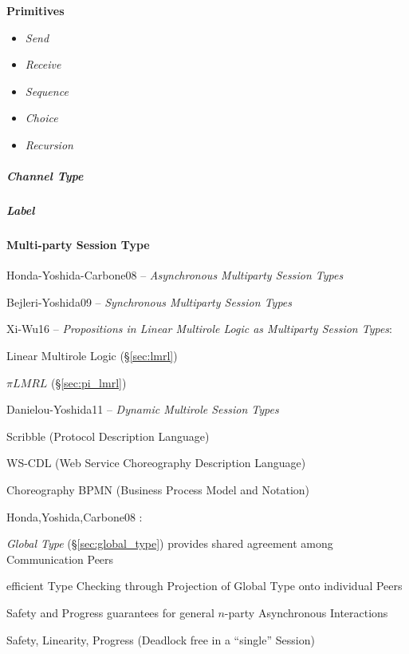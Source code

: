 \textbf{Primitives}

\begin{itemize}
  \item \emph{Send}
  \item \emph{Receive}
  \item \emph{Sequence}
  \item \emph{Choice}
  \item \emph{Recursion}
\end{itemize}



\subparagraph{Channel Type}\label{sec:channel_type}\hfill

\subparagraph{Label}\label{sec:channel_label}\hfill



\paragraph{Multi-party Session Type}\label{sec:multiparty_session}\hfill

Honda-Yoshida-Carbone08 -- \emph{Asynchronous Multiparty Session
  Types} \cite{honda-yoshida-carbone08}

Bejleri-Yoshida09 -- \emph{Synchronous Multiparty Session Types}

Xi-Wu16 -- \emph{Propositions in Linear Multirole Logic as
  Multiparty Session Types}:

Linear Multirole Logic (\S\ref{sec:lmrl})

$\pi LMRL$ (\S\ref{sec:pi_lmrl})

Danielou-Yoshida11 -- \emph{Dynamic Multirole Session Types}

\fist Scribble (Protocol Description Language)

\fist WS-CDL (Web Service Choreography Description Language)

\fist Choreography BPMN (Business Process Model and Notation)


\asterism


Honda,Yoshida,Carbone08 \cite{honda-yoshida-carbone08}:

\emph{Global Type} (\S\ref{sec:global_type}) provides shared agreement among
Communication Peers

efficient Type Checking through Projection of Global Type onto
individual Peers

Safety and Progress guarantees for general $n$-party Asynchronous
Interactions

Safety, Linearity, Progress (Deadlock free in a ``single'' Session)

